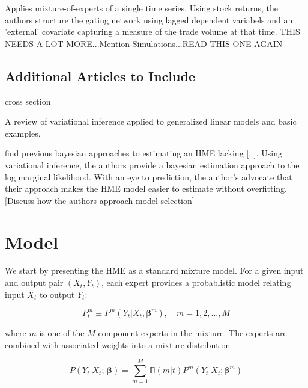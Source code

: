 \documentclass[12pt]{article}
\newcommand{\expmixwt}[0]{\mathbb{\Pi}}
\begin{document}
\cite{CarvalhoSkoulakis2010} Applies mixture-of-experts of a single time series.
Using stock returns, the authors structure the gating network using lagged
dependent variabels and an 'external' covariate capturing a measure of the
trade volume at that time. THIS NEEDS A LOT MORE...Mention Simulations...READ 
THIS ONE AGAIN




\subsection{Additional Articles to Include}


\cite{JeffriesPfeiffer2001} cross section

\cite{BleiKucukelbirMcAuliffe2006} A review of variational inference applied
to generalized linear models and basic examples.

\cite{UedaGhahramani2002}

\cite{BishopSvenson2003} find previous bayesian approaches to estimating an HME
lacking [\cite{HuertaJiangTanner2003}, \cite{UedaGhahramani2002}]. Using
variational inference, the authors provide a bayesian estimation approach
to the log marginal likelihood. With an eye to prediction, the author's advocate
that their approach makes the HME model easier to estimate without overfitting.
[Discuss how the authors approach model selection]


\cite{CarvalhoSkoulakis2005}

\bigskip


\section{Model} \label{sec:Model}

We start by presenting the HME as a standard mixture model.
For a given input and output pair $(X_{t}, Y_{t})$, each expert
provides a probablistic model relating input $X_{t}$ to output
$Y_{t}$:

\begin{equation} \label{eq:ConditionalDistribution}
  P^{m}_{t} \equiv P^{m}(Y_{t}|X_{t}, \boldsymbol{\beta}^{m}), \quad m = 1,2,...,M
\end{equation}

where $m$ is one of the $M$ component experts in the mixture. The experts
are combined with associated weights into a mixture distribution

\begin{equation} \label{eq:staticmixture}
  P(Y_{t} | X_{t}; \, \boldsymbol{\beta}) = \sum_{m=1}^{M} \expmixwt(m|t) P^{m}(Y_{t} | X_{t}; \boldsymbol{\beta}^{m})
\end{equation}
\end{document}
